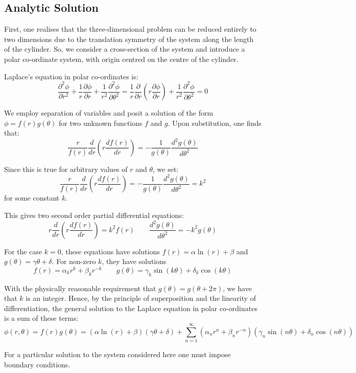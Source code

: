\documentclass[12pt, a4paper]{article}
\newcommand{\be}{\begin{equation}}
\newcommand{\ee}{\end{equation}}
\begin{document}
\subsection{Analytic Solution}

First, one realises that the three-dimensional problem can be reduced entirely to two
dimensions due to the translation symmetry of the system along the length of the
cylinder. So, we consider a cross-section of the system and introduce a polar
co-ordinate system, with origin centred on the centre of the cylinder.

Laplace's equation in polar co-ordinates is: 
%
\be
\frac{\partial^2 \phi}{\partial r^2}+\frac{1}{r}\frac{\partial \phi}{\partial r}+\frac{1}{r^2}\frac{\partial^2 \phi}{\partial \theta^2}
= \frac{1}{r}\frac{\partial}{\partial r}(r \frac{\partial \phi}{\partial r}) + \frac{1}{r^2}\frac{\partial ^2 \phi}{\partial \theta^2}
= 0
\ee

We employ separation of variables and posit a solution of the form
$\phi = f(r)g(\theta)$ for two unknown functions $f$ and $g$. Upon substitution,
one finds that:
%
\be
\frac{r}{f(r)}\frac{d}{dr}(r \frac{df(r)}{dr}) =- \frac{1}{g(\theta)}\frac{d^2 g(\theta)}{d\theta^2}
\ee

Since this is true for arbitrary values of $r$ and $\theta$, we set:
%
\be
\frac{r}{f(r)}\frac{d}{dr}(r \frac{df(r)}{dr}) =- \frac{1}{g(\theta)}\frac{d^2 g(\theta)}{d\theta^2}=k^2
\ee
%
for some constant $k$.

This gives two second order partial differential equations:
%
\be
r\frac{d}{dr}(r \frac{df(r)}{dr}) = k^2 f(r) \qquad
\frac{d^2 g(\theta)}{d\theta^2}=-k^2 g(\theta)
\ee

For the case $k=0$, these equations have solutions
$f(r)=\alpha \ln(r) + \beta$ and $g(\theta) = \gamma \theta + \delta$.
For non-zero $k$, they have solutions
%
\be
f(r)=\alpha_k r^k + \beta_k r^{-k}
\qquad
g(\theta)= \gamma_k \sin(k\theta)+\delta_k \cos(k\theta)
\ee

With the physically reasonable requirement that $g(\theta)=g(\theta + 2\pi)$, we have
that $k$ is an integer. Hence, by the principle of superposition and the linearity of
differentiation, the general solution to the Laplace equation in polar co-ordinates is
a sum of these terms:
%
\be
\phi(r,\theta)
= f(r)g(\theta)
= (\alpha \ln(r) + \beta)(\gamma\theta + \delta) + \sum_{n=1}^{\infty}(\alpha_n r^n+\beta_n r^{-n})(\gamma_n \sin(n\theta) + \delta_n \cos(n\theta))
\ee

For a particular solution to the system considered here one must impose boundary
conditions.
\end{document}
